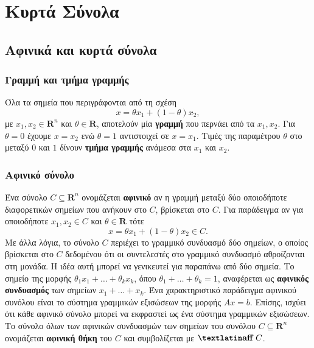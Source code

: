 \chapter{Κυρτά Σύνολα}
\section{Αφινικά και κυρτά σύνολα}
\subsection{Γραμμή και τμήμα γραμμής} Όλα τα σημεία που περιγράφονται από τη σχέση
\begin{equation*}
    x = \theta x_1 + (1 - \theta) x_2,
\end{equation*}
με $x_1, x_2 \in \mathbf{R}^n$ και $\theta \in \mathbf{R}$, αποτελούν μία
\textbf{γραμμή} που περνάει από τα $x_1, x_2$. Για $\theta = 0$ έχουμε $x = x_2$
ενώ $\theta  = 1$ αντιστοιχεί σε $x = x_1$. Τιμές της παραμέτρου $\theta$ στο
μεταξύ $0$ και $1$ δίνουν \textbf{τμήμα γραμμής} ανάμεσα στα $x_1$ και $x_2$.

\subsection{Αφινικό σύνολο} Ένα σύνολο $C \subseteq \mathbf{R}^n$ ονομάζεται \textbf{αφινικό} αν η γραμμή
μεταξύ δύο οποιοδήποτε διαφορετικών σημείων που ανήκουν στο $C$, βρίσκεται στο
$C$. Για παράδειγμα αν για οποιοδήποτε $x_1, x_2 \in C$ και $\theta \in
\mathbf{R}$ τότε
\begin{equation*}
    x = \theta x_1 + (1 - \theta) x_2 \in C.
\end{equation*}
Με άλλα λόγια, το σύνολο $C$ περιέχει το γραμμικό συνδυασμό δύο
σημείων, ο οποίος βρίσκεται στο $C$ δεδομένου ότι οι συντελεστές στο
γραμμικό συνδυασμό αθροίζονται στη μονάδα. Η ιδέα αυτή μπορεί να γενικευτεί για
παραπάνω από δύο σημεία. Το σημείο της μορφής $\theta_1 x_1 + \dots + \theta_k
x_k$, όπου $\theta_1 + \dots + \theta_k = 1$, αναφέρεται ως \textbf{αφινικός
συνδυασμός} των σημείων $x_1 + \dots + x_k$. Ένα χαρακτηριστικό παράδειγμα
αφινικού συνόλου είναι το σύστημα γραμμικών εξισώσεων της μορφής
$Ax = b$. Επίσης, ισχύει ότι κάθε αφινικό σύνολο μπορεί να
εκφραστεί ως ένα σύστημα γραμμικών εξισώσεων. Το σύνολο όλων των αφινικών
συνδυασμών των σημείων του συνόλου $C \subseteq \mathbf{R}^n$
ονομάζεται \textbf{αφινική θήκη} του $C$ και συμβολίζεται με
$\textbf{\tl{aff}} \ C$.

